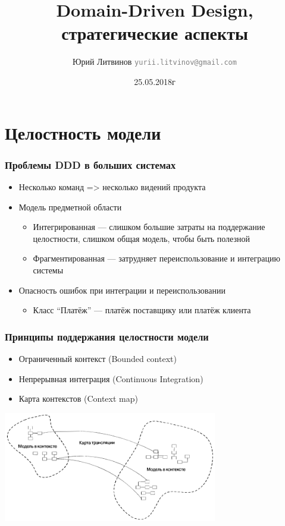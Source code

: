 \documentclass[xetex,mathserif,serif]{beamer}
\title{Domain-Driven Design, стратегические аспекты}
\author[Юрий Литвинов]{Юрий Литвинов \newline \textcolor{gray}{\small\texttt{yurii.litvinov@gmail.com}}}
\date{25.05.2018г}
\begin{document}
	
	\frame{\titlepage}

	\section{Целостность модели}

	\begin{frame}
		\frametitle{Проблемы DDD в больших системах}
		\begin{itemize}
			\item Несколько команд => несколько видений продукта
			\item Модель предметной области
			\begin{itemize}
				\item Интегрированная --- слишком большие затраты на поддержание целостности, слишком общая модель, чтобы быть полезной
				\item Фрагментированная --- затрудняет переиспользование и интеграцию системы
			\end{itemize}
			\item Опасность ошибок при интеграции и переиспользовании
			\begin{itemize}
				\item Класс ``Платёж'' --- платёж поставщику или платёж клиента
			\end{itemize}
		\end{itemize}
	\end{frame}

	\begin{frame}
		\frametitle{Принципы поддержания целостности модели}
		\begin{itemize}
			\item Ограниченный контекст (Bounded context)
			\item Непрерывная интеграция (Continuous Integration)
			\item Карта контекстов (Context map)
		\end{itemize}
		\begin{center}
			\includegraphics[width=0.7\textwidth]{contextMap.png}
		\end{center}
	\end{frame}
\end{document}
